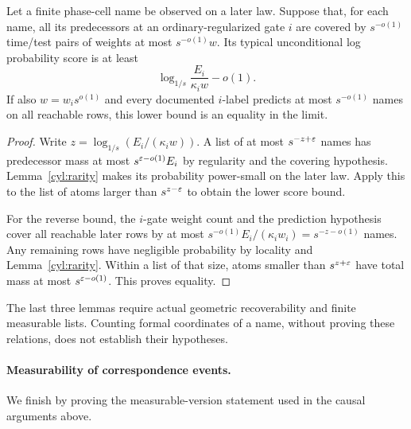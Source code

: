 \begin{lemma}\label{cyl:phase-name}
Let a finite phase-cell name be observed on a later law.  Suppose that,
for each name, all its predecessors at an ordinary-regularized gate
$i$ are covered by $s^{-o(1)}$ time/test pairs of weights at most
$s^{-o(1)}w$.  Its typical unconditional log probability score is at least
\[
 \log_{1/s}\frac{E_i}{\kappa_iw}-o(1).
\]
If also $w=w_i s^{o(1)}$ and every documented $i$-label predicts at most
$s^{-o(1)}$ names on all reachable rows, this lower bound is an equality
in the limit.
\end{lemma}

\begin{proof}
Write $z=\log_{1/s}(E_i/(\kappa_iw))$.  A list of at most
$s^{-z+\varepsilon}$ names has predecessor mass at most
$s^{\varepsilon-o(1)}E_i$ by regularity and the covering hypothesis.
Lemma~\ref{cyl:rarity} makes its probability power-small on the later
law.  Apply this to the list of atoms larger than $s^{z-\varepsilon}$ to
obtain the lower score bound.

For the reverse bound, the $i$-gate weight count and the prediction
hypothesis cover all reachable later rows by at most
$s^{-o(1)}E_i/(\kappa_iw_i)=s^{-z-o(1)}$ names.  Any remaining rows
have negligible probability by locality and Lemma~\ref{cyl:rarity}.
Within a list of that size, atoms smaller than $s^{z+\varepsilon}$ have total
mass at most $s^{\varepsilon-o(1)}$.  This proves equality.
\end{proof}

The last three lemmas require actual geometric recoverability and finite
measurable lists.  Counting formal coordinates of a name, without
proving these relations, does not establish their hypotheses.

\paragraph{Measurability of correspondence events.}
We finish by proving the measurable-version statement used in the causal
arguments above.


